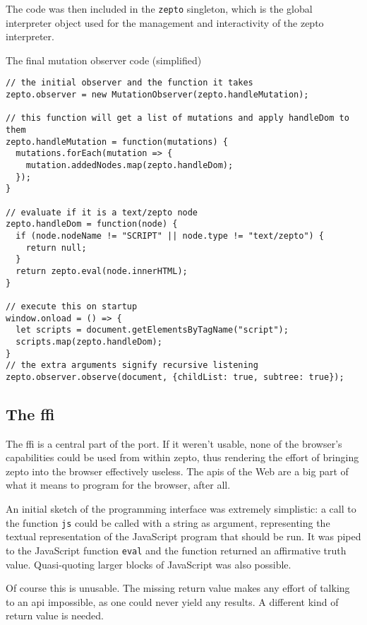 \documentclass[oneside,11pt,xetex]{scrbook}
\begin{document}
The code was then included in the \texttt{zepto} singleton, which is the global interpreter object
used for the management and interactivity of the zepto interpreter.

\begin{listing}[H]
\caption{The final mutation observer code (simplified)}
\begin{verbatim}
// the initial observer and the function it takes
zepto.observer = new MutationObserver(zepto.handleMutation);

// this function will get a list of mutations and apply handleDom to them
zepto.handleMutation = function(mutations) {
  mutations.forEach(mutation => {
    mutation.addedNodes.map(zepto.handleDom);
  });
}

// evaluate if it is a text/zepto node
zepto.handleDom = function(node) {
  if (node.nodeName != "SCRIPT" || node.type != "text/zepto") {
    return null;
  }
  return zepto.eval(node.innerHTML);
}

// execute this on startup
window.onload = () => {
  let scripts = document.getElementsByTagName("script");
  scripts.map(zepto.handleDom);
}
// the extra arguments signify recursive listening
zepto.observer.observe(document, {childList: true, subtree: true});
\end{verbatim}
\end{listing}

\subsection{The \gls{ffi}}

The \gls{ffi} is a central part of the port. If it weren't usable, none of the browser's
capabilities could be used from within zepto, thus rendering the effort of bringing zepto into
the browser effectively useless. The \gls{api}s of the Web are a big part of what it means to
program for the browser, after all.

An initial sketch of the programming interface was extremely simplistic: a call to the
function \texttt{js} could be called with a string as argument, representing the textual
representation of the JavaScript program that should be run. It was piped to the JavaScript
function \texttt{eval} and the function returned an affirmative truth value. Quasi-quoting
larger blocks of JavaScript was also possible.

Of course this is unusable. The missing return value makes any effort of talking to an
\gls{api} impossible, as one could never yield any results. A different kind of return
value is needed.
\end{document}
